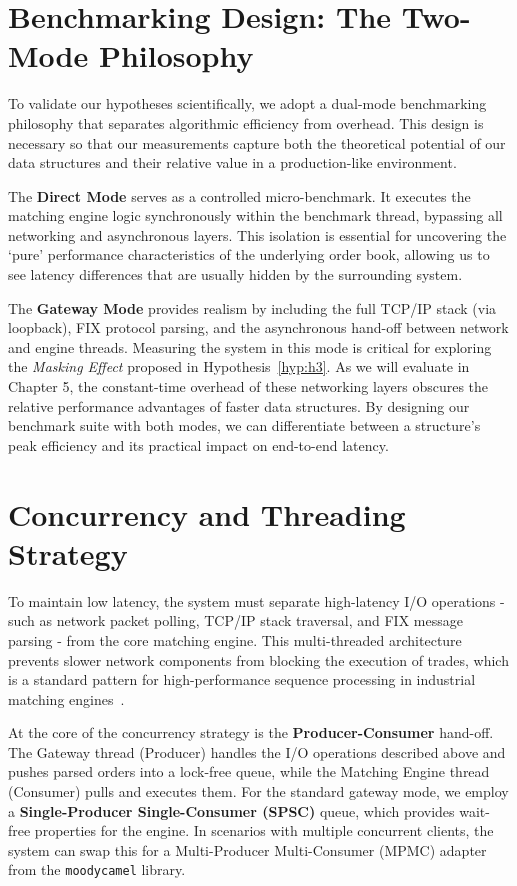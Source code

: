 \section{Benchmarking Design: The Two-Mode Philosophy}
To validate our hypotheses scientifically, we adopt a dual-mode 
benchmarking philosophy that separates algorithmic efficiency from 
overhead. This design is necessary so that our measurements capture 
both the theoretical potential of our data structures and their relative 
value in a production-like environment.

The \textbf{Direct Mode} serves as a controlled micro-benchmark. It 
executes the matching engine logic synchronously within the benchmark 
thread, bypassing all networking and asynchronous layers. This isolation is 
essential for uncovering the `pure' performance characteristics of the 
underlying order book, allowing us to see latency differences that are 
usually hidden by the surrounding system.

The \textbf{Gateway Mode} provides realism by including the 
full TCP/IP stack (via loopback), FIX protocol parsing, and the 
asynchronous hand-off between network and engine threads. 
Measuring the system in this mode is critical for exploring the \textit{Masking 
Effect} proposed in Hypothesis~\ref{hyp:h3}. 
As we will evaluate in Chapter 5, the constant-time overhead of these 
networking layers obscures the relative performance advantages of faster 
data structures. 
By designing our benchmark suite with both modes, we can differentiate between 
a structure's peak efficiency and its practical impact on end-to-end latency.

\section{Concurrency and Threading Strategy}
To maintain low latency, the system must separate high-latency I/O 
operations - such as network packet polling, TCP/IP stack traversal, and 
FIX message parsing - from the core matching engine. 
This multi-threaded architecture prevents slower network components from 
blocking the execution of trades, which is a standard pattern for 
high-performance sequence processing in industrial matching 
engines~\citep{thompson2011disruptor}.

At the core of the concurrency strategy is the \textbf{Producer-Consumer} 
hand-off. The Gateway thread (Producer) handles the I/O operations 
described above and pushes parsed orders into a lock-free queue, while the 
Matching Engine thread (Consumer) pulls and executes them. For the 
standard gateway mode, we employ a \textbf{Single-Producer Single-Consumer 
(SPSC)} queue, which provides wait-free properties for the engine. In 
scenarios with multiple concurrent clients, the system can swap this for a 
Multi-Producer Multi-Consumer (MPMC) adapter from the \texttt{moodycamel} 
library.

